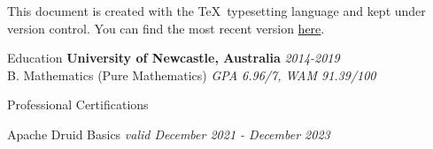 \documentclass{resume} %
\begin{document}
This document is created with the \TeX \ typesetting language and kept under version control.
You can find the most recent version \href{https://github.com/joegurr/resume/blob/main/resume.pdf}{here}.


\begin{rSection}{Education}
    {\bf University of Newcastle, Australia} \hfill {\em 2014-2019}
    \\ B. Mathematics (Pure Mathematics) \hfill {\em GPA 6.96/7, WAM 91.39/100}
\end{rSection}


\begin{rSection}{Professional Certifications}
    \item Apache Druid Basics \hfill {\em valid December 2021 - December 2023}
\end{rSection}

\end{document}

